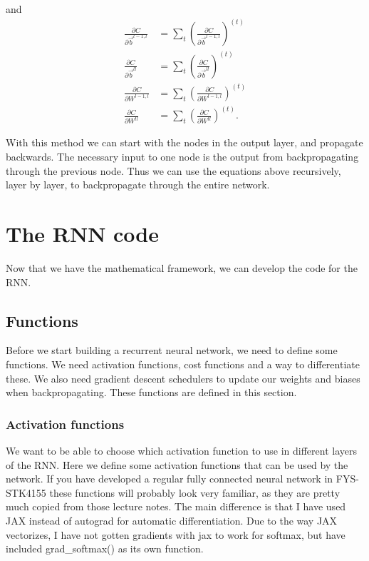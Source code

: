 \documentclass[11pt]{article}
\begin{document}
    and \begin{align}
\frac{\partial C}{\partial \vec{b}^{l-1,l}} &= \sum_t \left( \frac{\partial C}{\partial \vec{b}^{l-1,l}} \right)^{(t)}
\\[4ex]
\frac{\partial C}{\partial \vec{b}^{ll}} &= \sum_t \left( \frac{\partial C}{\partial \vec{b}^{ll}} \right)^{(t)}
\\[4ex]
\frac{\partial C}{\partial W^{l-1,l}} &= \sum_t \left( \frac{\partial C}{\partial W^{l-1,l}} \right)^{(t)}
\\[4ex]
\frac{\partial C}{\partial W^{ll}} &= \sum_t \left( \frac{\partial C}{\partial W^{ll}} \right)^{(t)}.
\end{align}

    With this method we can start with the nodes in the output layer, and
propagate backwards. The necessary input to one node is the output from
backpropagating through the previous node. Thus we can use the equations
above recursively, layer by layer, to backpropagate through the entire
network.

    

    \section{The RNN code}\label{the-rnn-code}

    Now that we have the mathematical framework, we can develop the code for
the RNN.

    \subsection{Functions}\label{functions}

    Before we start building a recurrent neural network, we need to define
some functions. We need activation functions, cost functions and a way
to differentiate these. We also need gradient descent schedulers to
update our weights and biases when backpropagating. These functions are
defined in this section.

    \subsubsection{Activation functions}\label{activation-functions}

    We want to be able to choose which activation function to use in
different layers of the RNN. Here we define some activation functions
that can be used by the network. If you have developed a regular fully
connected neural network in FYS-STK4155 these functions will probably
look very familiar, as they are pretty much copied from those lecture
notes. The main difference is that I have used JAX instead of autograd
for automatic differentiation. Due to the way JAX vectorizes, I have not
gotten gradients with jax to work for softmax, but have included
grad\_softmax() as its own function.
\end{document}
